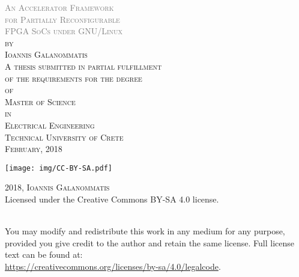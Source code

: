 \thispagestyle{empty}
\begin{center}
	\textsc{
	\textcolor{gray} {\huge
		An Accelerator Framework\\ 
		for Partially Reconfigurable \\
		FPGA SoCs under GNU/Linux\\
	}
	\vspace{50pt}
	by\\
	\vspace{20pt}
	\large Ioannis Galanommatis\\
	\vspace{80pt}
		A thesis submitted in partial fulfillment\\
		of the requirements for the degree\\
		\vspace{12pt}
		of\\
		\vspace{12pt}
		{\large Master of Science\\}
		\vspace{12pt}
		in\\
		\vspace{12pt}
		{\large Electrical Engineering\\}
	}
	\vspace*{\fill}
	\textsc{\large Technical University of Crete\\February, 2018\\}
	
\end{center}

\newpage

\thispagestyle{empty}
\vspace*{\fill}
\noindent
\begin{minipage}{0.2\textwidth}
\noindent \texttt{[image: img/CC-BY-SA.pdf]}
\end{minipage}\hfill
\begin{minipage}{0.8\textwidth}
{\scshape 2018, Ioannis Galanommatis\\}
\rmfamily\textup{Licensed under the Creative Commons BY-SA 4.0 license.}
\end{minipage}
\medskip\\
You may modify and redistribute this work in any medium for any purpose,
provided you give credit to the author and retain the same license.
Full license text can be found at: \\
\url{https://creativecommons.org/licenses/by-sa/4.0/legalcode}.
\vspace*{\fill}
